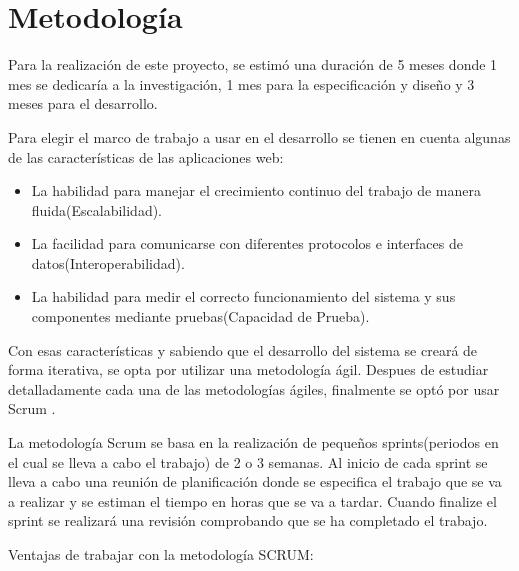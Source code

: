 \chapter{Metodología}

Para la realización de este proyecto, se estimó una duración de 5 meses donde 1 mes se dedicaría a la investigación, 1 mes para la especificación y diseño y 3 meses para el desarrollo. 

\vspace{5 mm}

Para elegir el marco de trabajo a usar en el desarrollo se tienen en cuenta algunas de las características de las aplicaciones web:

\begin{itemize}

\item La habilidad para manejar el crecimiento continuo del trabajo de manera fluida(Escalabilidad).  

\item La facilidad para comunicarse con diferentes protocolos e interfaces de datos(Interoperabilidad). 

\item La habilidad para medir el correcto funcionamiento del sistema y sus componentes mediante pruebas(Capacidad de Prueba). 

\end{itemize}


\vspace{5 mm}

Con esas características y sabiendo que el desarrollo del sistema se creará de forma iterativa, se opta por utilizar una metodología ágil. Despues de estudiar detalladamente cada una de las metodologías ágiles, finalmente se optó por usar Scrum \cite{scrum}.

\vspace{5 mm}

La metodología Scrum se basa en la realización de pequeños sprints(periodos en el cual se lleva a cabo el trabajo) de 2 o 3 semanas. Al inicio de cada sprint se lleva a cabo una reunión de planificación donde se especifica el trabajo que se va a realizar y se estiman el tiempo en horas que se va a tardar. Cuando finalize el sprint se realizará una revisión comprobando que se ha completado el trabajo.

\vspace{5 mm}

Ventajas de trabajar con la metodología SCRUM:

